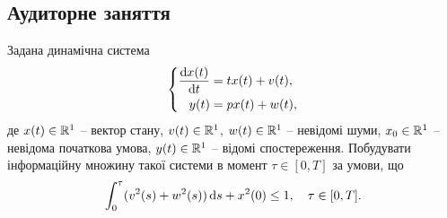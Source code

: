\newpage

\subsection{Аудиторне заняття}

\begin{problem}
	Задана динамічна система \[ \left\{ \begin{aligned}
		\frac{\mathop{}\!\mathrm{d} x(t)}{\mathop{}\!\mathrm{d} t} &= t x(t) + v(t), \\
		y(t) &= p x(t) + w(t),
	\end{aligned} \right. \]
	де $x(t) \in \mathbb{R}^1$ -- вектор стану, $v(t) \in \mathbb{R}^1$, $w(t) \in \mathbb{R}^1$ -- невідомі шуми, $x_0 \in \mathbb{R}^1$ -- невідома початкова умова, $y(t) \in \mathbb{R}^1$ -- відомі спостереження. Побудувати інформаційну множину такої системи в момент $\tau \in [0, T]$ за умови, що \[ \int_0^\tau (v^2(s) + w^2(s)) \mathop{}\!\mathrm{d} s + x^2(0) \le 1, \quad \tau \in [0, T]. \]
\end{problem}

